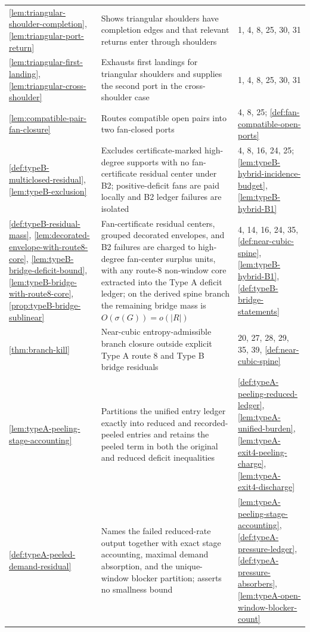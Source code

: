 \documentclass[11pt]{article}
\begin{document}
{\begin{longtable}{L{0.31\textwidth} L{0.42\textwidth} L{0.17\textwidth}}
\cref{lem:triangular-shoulder-completion}, \cref{lem:triangular-port-return} & Shows triangular shoulders have completion edges and that relevant returns enter through shoulders & 1, 4, 8, 25, 30, 31 \\
\cref{lem:triangular-first-landing}, \cref{lem:triangular-cross-shoulder} & Exhausts first landings for triangular shoulders and supplies the second port in the cross-shoulder case & 1, 4, 8, 25, 30, 31 \\
\cref{lem:compatible-pair-fan-closure} & Routes compatible open pairs into two fan-closed ports & 4, 8, 25; \cref{def:fan-compatible-open-ports} \\
\cref{def:typeB-multiclosed-residual}, \cref{lem:typeB-exclusion} & Excludes certificate-marked high-degree supports with no fan-certificate residual center under B2; positive-deficit fans are paid locally and B2 ledger failures are isolated & 4, 8, 16, 24, 25; \cref{lem:typeB-hybrid-incidence-budget}, \cref{lem:typeB-hybrid-B1} \\
\cref{def:typeB-residual-mass}, \cref{lem:decorated-envelope-with-route8-core}, \cref{lem:typeB-bridge-deficit-bound}, \cref{lem:typeB-bridge-with-route8-core}, \cref{prop:typeB-bridge-sublinear} & Fan-certificate residual centers, grouped decorated envelopes, and B2 failures are charged to high-degree fan-center surplus units, with any route-8 non-window core extracted into the Type A deficit ledger; on the derived spine branch the remaining bridge mass is $O(\sigma(G))=o(|R|)$ & 4, 14, 16, 24, 35, \cref{def:near-cubic-spine}, \cref{lem:typeB-hybrid-B1}, \cref{def:typeB-bridge-statements} \\
\cref{thm:branch-kill} & Near-cubic entropy-admissible branch closure outside explicit Type A route 8 and Type B bridge residuals & 20, 27, 28, 29, 35, 39, \cref{def:near-cubic-spine} \\
\cref{lem:typeA-peeling-stage-accounting} & Partitions the unified entry ledger exactly into reduced and recorded-peeled entries and retains the peeled term in both the original and reduced deficit inequalities & \cref{def:typeA-peeling-reduced-ledger}, \cref{lem:typeA-unified-burden}, \cref{lem:typeA-exit4-peeling-charge}, \cref{lem:typeA-exit4-discharge} \\
\cref{def:typeA-peeled-demand-residual} & Names the failed reduced-rate output together with exact stage accounting, maximal demand absorption, and the unique-window blocker partition; asserts no smallness bound & \cref{lem:typeA-peeling-stage-accounting}, \cref{def:typeA-pressure-ledger}, \cref{def:typeA-pressure-absorbers}, \cref{lem:typeA-open-window-blocker-count} \\

\end{longtable}}
\end{document}
